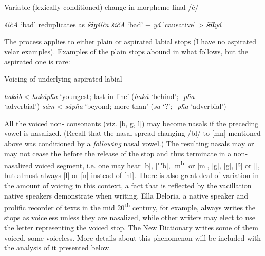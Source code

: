 \documentclass[output=paper]{LSP/langsci}
\begin{document}
\begin{exe}
\ex\label{ex:rood:5}
Variable (lexically conditioned) change in morpheme-final /\v{c}/
\begin{xlist}
\ex \textit{\v{s}í\v{c}A} `bad' reduplicates as \textit{\textbf{\v{s}ig}\v{s}í\v{c}a}
\ex \textit{\v{s}i\v{c}A} `bad' + \textit{yá} 'causative' > \textit{\textbf{\v{s}il}yá}
\end{xlist}
\end{exe}

The process applies to either plain or aspirated labial stops (I have no aspirated velar examples). Examples of the plain stops abound in what follows, but the aspirated one is rare:

\begin{exe}
\ex \label{ex:rood:6}
Voicing of underlying aspirated labial
\begin{xlist}
\ex \textit{hakáb} < \textit{hakáp\v{h}a} `youngest; last in line' (\textit{haká} `behind'; \textit{-p\v{h}a} \\ `adverbial')
\ex \textit{sám} < \textit{sáp\v{h}a} `beyond; more than' (\textit{sa} `?'; \textit{-p\v{h}a}  `adverbial')
\end{xlist}
\end{exe}

All the voiced non- consonants (viz. [b, g, l]) may become nasals if the preceding vowel is nasalized. (Recall that the nasal spread changing /bl/ to [mn] mentioned above was conditioned by a \textit{following} nasal vowel.) The resulting nasals may or may not cease the  before the release of the stop and thus terminate in a non-nasalized voiced segment, i.e. one may hear [b], [\textsuperscript{m}b], [m\textsuperscript{b}] or [m], [g], [\textsuperscript{}g], [\textsuperscript{g}] or [], but almost always [l] or [n] instead of [nl]. There is also great deal of variation in the amount of voicing in this context, a fact that is reflected by the vacillation native speakers demonstrate when writing. Ella Deloria, a native speaker and prolific recorder of  texts in the mid 20\textsuperscript{th} century, for example, always writes the stops as voiceless unless they are nasalized, while other writers may elect to use the letter representing the voiced stop. The New  Dictionary writes some of them voiced, some voiceless. More details about this phenomenon will be included with the analysis of it presented below.
\end{document}

